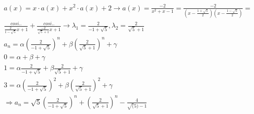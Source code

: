 \documentclass[a4paper]{article}
\begin{document}
\text{}\vspace{-0.1cm}
{\fontsize{12}{15}\selectfont \hspace{-0.5cm}}

\begin{align}
	& a(x) = x\cdot a(x) + x^2 \cdot a(x) + 2 \rightarrow a(x) = \frac{-2}{x^2+x-1} = \frac{-2}{(x-\frac{1+\sqrt{5}}{2})(x-\frac{1-\sqrt{5}}{2})} = \\
	& \frac{cosi..}{\frac{2}{1-\sqrt{5}} x + 1} + \frac{cosi..}{\frac{-2}{\sqrt{5}+1} x + 1} \rightarrow \lambda_1 = \frac{2}{-1+\sqrt{5}}, \lambda_2 = \frac{2}{\sqrt{5}+1} \\
	& a_n = \alpha (\frac{2}{-1+\sqrt{5}})^n + \beta (\frac{2}{\sqrt{5}+1})^n + \gamma \\
	& 0 = \alpha + \beta + \gamma \\
	& 1 = \alpha \frac{2}{-1+\sqrt{5}} + \beta \frac{2}{\sqrt{5}+1} + \gamma \\
	& 3 = \alpha (\frac{2}{-1+\sqrt{5}})^2 + \beta (\frac{2}{\sqrt{5}+1})^2 +\gamma \\
	& \Rightarrow a_n = \sqrt{5} (\frac{2}{-1+\sqrt{5}})^n + (\frac{2}{\sqrt{5}+1})^n  -\frac{4}{\sqrt(5)-1}
\end{align}
\end{document}
